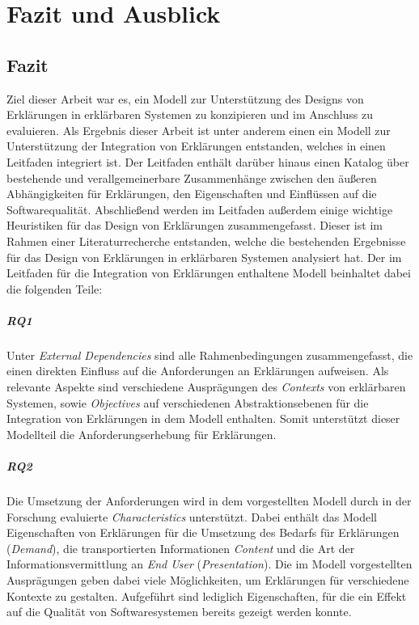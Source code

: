 \chapter{Fazit und Ausblick}

\section{Fazit}

Ziel dieser Arbeit war es, ein Modell zur Unterstützung des Designs von Erklärungen in erklärbaren Systemen zu konzipieren und im Anschluss zu evaluieren. Als Ergebnis dieser Arbeit ist unter anderem einen ein Modell zur Unterstützung der Integration von Erklärungen entstanden, welches in einen Leitfaden integriert ist. Der Leitfaden enthält darüber hinaus einen Katalog über bestehende und verallgemeinerbare Zusammenhänge zwischen den äußeren Abhängigkeiten für Erklärungen, den Eigenschaften und Einflüssen auf die Softwarequalität. Abschließend werden im Leitfaden außerdem einige wichtige Heuristiken für das Design von Erklärungen zusammengefasst. Dieser ist im Rahmen einer Literaturrecherche entstanden, welche die bestehenden Ergebnisse für das Design von Erklärungen in erklärbaren Systemen analysiert hat. Der im Leitfaden für die Integration von Erklärungen enthaltene Modell beinhaltet dabei die folgenden Teile:

\paragraph{RQ1} Unter \textit{External Dependencies} sind alle Rahmenbedingungen zusammengefasst, die einen direkten Einfluss auf die Anforderungen an Erklärungen aufweisen. Als relevante Aspekte sind verschiedene Ausprägungen des \textit{Contexts} von erklärbaren Systemen, sowie \textit{Objectives} auf verschiedenen Abstraktionsebenen für die Integration von Erklärungen in dem Modell enthalten. Somit unterstützt dieser Modellteil die Anforderungserhebung für Erklärungen.

\paragraph{RQ2} Die Umsetzung der Anforderungen wird in dem vorgestellten Modell durch in der Forschung evaluierte \textit{Characteristics} unterstützt. Dabei enthält das Modell Eigenschaften von Erklärungen für die Umsetzung des Bedarfs für Erklärungen (\textit{Demand}), die transportierten Informationen \textit{Content} und die Art der Informationsvermittlung an \textit{End User} (\textit{Presentation}). Die im Modell vorgestellten Ausprägungen geben dabei viele Möglichkeiten, um Erklärungen für verschiedene Kontexte zu gestalten. Aufgeführt sind lediglich Eigenschaften, für die ein Effekt auf die Qualität von Softwaresystemen bereits gezeigt werden konnte.

